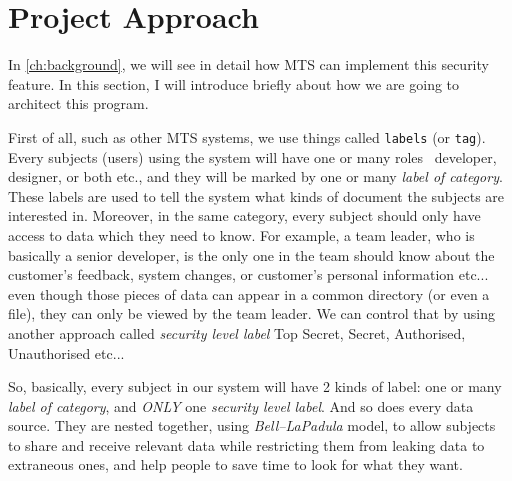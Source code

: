 \section{Project Approach}
In \autoref{ch:background}, we will see in detail how MTS can implement this security feature.
In this section, I will introduce briefly about how we are going to architect this program.

First of all, such as other MTS systems, we use things called \texttt{labels} (or \texttt{tag}).
Every subjects (\ie users) using the system will have one or many roles \eg\, developer, designer, or both etc., and they will be marked by one or many \emph{label of category}.
These labels are used to tell the system what kinds of document the subjects are interested in.
Moreover, in the same category, every subject should only have access to data which they need to know.
For example, a team leader, who is basically a senior developer, is the only one in the team should know about the customer's feedback, system changes, or customer's personal information etc...
even though those pieces of data can appear in a common directory (or even a file), they can only be viewed by the team leader.
We can control that by using another approach called \emph{security level label} \eg Top Secret, Secret, Authorised, Unauthorised etc...

So, basically, every subject in our system will have 2 kinds of label:
one or many \emph{label of category}, 
and \emph{ONLY} one \emph{security level label}.
And so does every data source.
They are nested together, using \emph{Bell--LaPadula} model,
to allow subjects to share and receive relevant data while restricting them from leaking data to extraneous ones,
and help people to save time to look for what they want.
